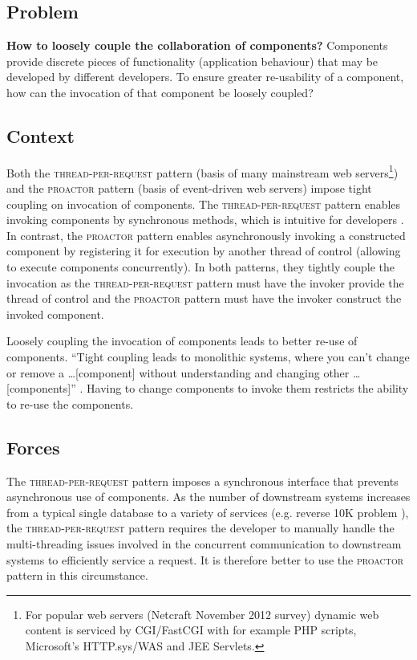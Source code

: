 \documentclass[prodmode]{style/acmlarge}
\begin{document}
\subsection{Problem}

\textbf{How to loosely couple the collaboration of components?}  Components
provide discrete pieces of functionality (application behaviour) that may be
developed by different developers.  To ensure greater re-usability of a
component, how can the invocation of that component be loosely coupled?


\subsection{Context}

Both the \textsc{thread-per-request} pattern \cite{thread-per-request} (basis of
many mainstream web servers\footnote{For popular web servers (Netcraft November
2012 survey) dynamic web content is serviced by CGI/FastCGI with for example PHP
scripts, Microsoft's HTTP.sys/WAS and JEE Servlets.}) and the \textsc{proactor}
pattern \cite{proactor} (basis of event-driven web servers) impose tight
coupling on invocation of components.  The \textsc{thread-per-request} pattern
enables invoking components by synchronous methods, which is intuitive for
developers \cite[p. 2]{proactor}.  In contrast, the \textsc{proactor} pattern
enables asynchronously invoking a constructed component by registering it for
execution by another thread of control (allowing to execute components
concurrently).  In both patterns, they tightly couple the invocation as the
\textsc{thread-per-request} pattern must have the invoker provide the thread of
control and the \textsc{proactor} pattern must have the invoker construct the
invoked component.

Loosely coupling the invocation of components leads to better re-use of
components.  ``Tight coupling leads to monolithic systems, where you can't
change or remove a \ldots [component] without understanding and changing other
\ldots [components]'' \cite[p. 24-25]{gof}.  Having to change components to
invoke them restricts the ability to re-use the components.


\subsection{Forces}

The \textsc{thread-per-request} pattern imposes a synchronous interface that
prevents asynchronous use of components.  As the number of downstream systems
increases from a typical single database to a variety of services (e.g.
reverse 10K problem \cite{reverse-ten-k-problem}), the
\textsc{thread-per-request} pattern requires the developer to manually handle
the multi-threading issues involved in the concurrent communication to
downstream systems to efficiently service a request.  It is therefore better to
use the \textsc{proactor} pattern in this circumstance.
\end{document}
